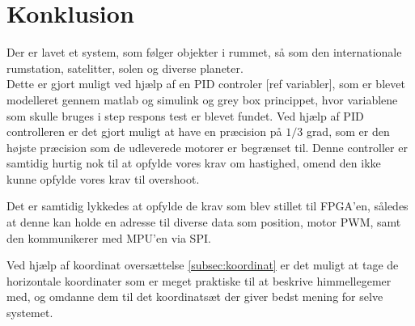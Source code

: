 \section{Konklusion}
Der er lavet et system, som følger objekter i rummet, så som den internationale rumstation, satelitter, solen og diverse planeter.\\
Dette er gjort muligt ved hjælp af en PID controler [ref variabler], som er blevet modelleret gennem matlab og simulink og grey box princippet, hvor variablene som skulle bruges i step respons test er blevet fundet. Ved hjælp af PID controlleren er det gjort muligt at have en præcision på $1/3$ grad, som er den højste præcision som de udleverede motorer er begrænset til. Denne controller er samtidig hurtig nok til at opfylde vores krav om hastighed, omend den ikke kunne opfylde vores krav til overshoot.

Det er samtidig lykkedes at opfylde de krav som blev stillet til FPGA'en, således at denne kan holde en adresse til diverse data som position, motor PWM, samt den kommunikerer med MPU'en via SPI.

Ved hjælp af koordinat oversættelse \ref{subsec:koordinat} er det muligt at tage de horizontale koordinater som er meget praktiske til at beskrive himmellegemer med, og omdanne dem til det koordinatsæt der giver bedst mening for selve systemet.